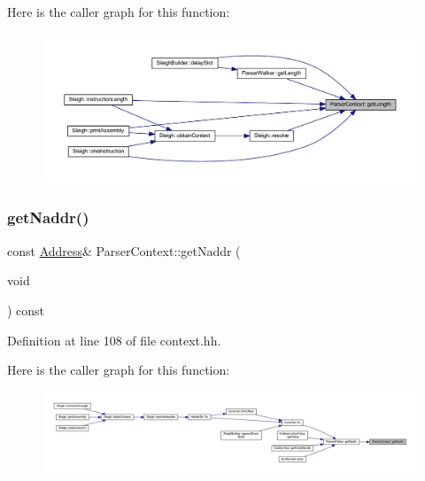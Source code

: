 Here is the caller graph for this function\+:
\nopagebreak
\begin{figure}[H]
\begin{center}
\leavevmode
\includegraphics[width=350pt]{class_parser_context_a9771627b94baf35822436ae402cce979_icgraph}
\end{center}
\end{figure}
\mbox{\label{class_parser_context_aecef32b0b498d6dcb78ca223f2737061}} 
\subsubsection{\texorpdfstring{getNaddr()}{getNaddr()}}
{\footnotesize\ttfamily const \mbox{\hyperlink{class_address}{Address}}\& Parser\+Context\+::get\+Naddr (\begin{DoxyParamCaption}\item[{void}]{ }\end{DoxyParamCaption}) const\hspace{0.3cm}{\ttfamily [inline]}}



Definition at line 108 of file context.\+hh.

Here is the caller graph for this function\+:
\nopagebreak
\begin{figure}[H]
\begin{center}
\leavevmode
\includegraphics[width=350pt]{class_parser_context_aecef32b0b498d6dcb78ca223f2737061_icgraph}
\end{center}
\end{figure}
\mbox{\label{class_parser_context_a092b001f0511b580e0fed894baf20036}} 

